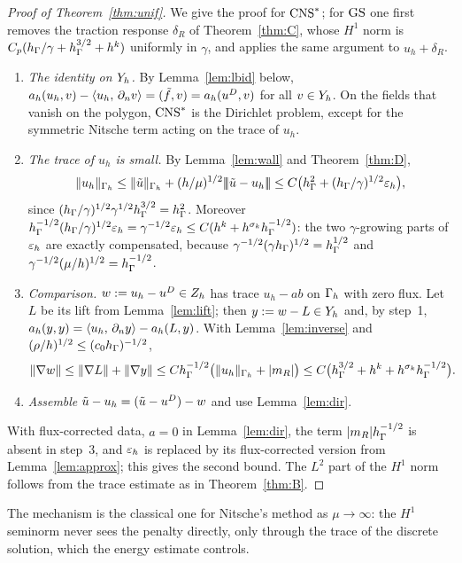 \begin{proof}[Proof of Theorem~\ref{thm:unif}]
We give the proof for $\mathrm{CNS}^\ast$; for $\mathrm{GS}$ one first removes the traction response $\delta_R$ of Theorem~\ref{thm:C}, whose $H^1$ norm is $C_p(h_\Gamma/\gamma+h_\Gamma^{3/2}+h^k)$ uniformly in $\gamma$, and applies the same argument to $u_h+\delta_R$.
\begin{enumerate}
\item \emph{The identity on $Y_h$.} By Lemma~\ref{lem:lbid} below, $a_h(u_h,v)-\langle u_h,\, \partial_n v\rangle=(\tilde f,v)=a_h(u^D,v)$ for all $v\in Y_h$. On the fields that vanish on the polygon, $\mathrm{CNS}^\ast$ is the Dirichlet problem, except for the symmetric Nitsche term acting on the trace of $u_h$.
\item \emph{The trace of $u_h$ is small.} By Lemma~\ref{lem:wall} and Theorem~\ref{thm:D},
\[
\lVert u_h\rVert_{\Gamma_h}\le\lVert \tilde u\rVert_{\Gamma_h}+(h/\mu)^{1/2}|\!|\!|\tilde u-u_h|\!|\!|\le C\bigl(h_\Gamma^2+(h_\Gamma/\gamma)^{1/2}\varepsilon_h\bigr),
\]
since $(h_\Gamma/\gamma)^{1/2}\gamma^{1/2}h_\Gamma^{3/2}=h_\Gamma^2$. Moreover $h_\Gamma^{-1/2}(h_\Gamma/\gamma)^{1/2}\varepsilon_h=\gamma^{-1/2}\varepsilon_h\le C(h^k+h^{\sigma_k}h_\Gamma^{-1/2})$: the two $\gamma$-growing parts of $\varepsilon_h$ are exactly compensated, because $\gamma^{-1/2}(\gamma h_\Gamma)^{1/2}=h_\Gamma^{1/2}$ and $\gamma^{-1/2}(\mu/h)^{1/2}=h_\Gamma^{-1/2}$.
\item \emph{Comparison.} $w:=u_h-u^D\in Z_h$ has trace $u_h-ab$ on $\Gamma_h$ with zero flux. Let $L$ be its lift from Lemma~\ref{lem:lift}; then $y:=w-L\in Y_h$ and, by step~1, $a_h(y,y)=\langle u_h,\, \partial_n y\rangle-a_h(L,y)$. With Lemma~\ref{lem:inverse} and $(\rho/h)^{1/2}\le(c_0h_\Gamma)^{-1/2}$,
\[
\lVert \nabla w\rVert\le\lVert \nabla L\rVert+\lVert \nabla y\rVert\le Ch_\Gamma^{-1/2}\bigl(\lVert u_h\rVert_{\Gamma_h}+|m_R|\bigr)\le C\bigl(h_\Gamma^{3/2}+h^k+h^{\sigma_k}h_\Gamma^{-1/2}\bigr).
\]
\item \emph{Assemble} $\tilde u-u_h=(\tilde u-u^D)-w$ and use Lemma~\ref{lem:dir}.
\end{enumerate}
With flux-corrected data, $a=0$ in Lemma~\ref{lem:dir}, the term $|m_R|h_\Gamma^{-1/2}$ is absent in step~3, and $\varepsilon_h$ is replaced by its flux-corrected version from Lemma~\ref{lem:approx}; this gives the second bound. The $L^2$ part of the $H^1$ norm follows from the trace estimate as in Theorem~\ref{thm:B}.
\end{proof}

The mechanism is the classical one for Nitsche's method as $\mu\to\infty$: the $H^1$ seminorm never sees the penalty directly, only through the trace of the discrete solution, which the energy estimate controls.

